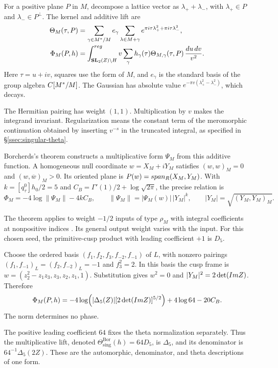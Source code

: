 For a positive plane \(P\) in \(M\), decompose a lattice vector
as \(\lambda_++\lambda_-\), with \(\lambda_+\in P\) and
\(\lambda_-\in P^\perp\). The
kernel and additive lift are
\begin{align*}
 \Theta_M(\tau,P)&=\sum_{\gamma\in M^*/M}e_\gamma
 \sum_{\lambda\in M+\gamma}
 e^{\pi i\tau\lambda_+^2+\pi i\tau\lambda_-^2},\\
 \Phi_M(P,h)&=\int^{reg}_{\mathbf{SL}_2(Z)\backslash H}
 v\sum_\gamma h_\gamma(\tau)
 \Theta_{M,\gamma}(\tau,P)\,\frac{du\,dv}{v^2}.
\end{align*}
Here \(\tau=u+iv\), squares use the form of \(M\), and
\(e_\gamma\) is the standard basis of the group algebra \(C[M^*/M]\).
The Gaussian has absolute value
\(e^{-\pi v(\lambda_+^2-\lambda_-^2)}\), which decays.

The Hermitian pairing has weight \((1,1)\). Multiplication by
\(v\) makes the integrand invariant. Regularization means the
constant term of the meromorphic continuation obtained by inserting
\(v^{-s}\) in the truncated integral, as specified in
\S\ref{ssec:singular-theta}.

Borcherds's theorem constructs a multiplicative form \(\Psi_M\)
from this additive function. A homogeneous null coordinate
\(w=X_M+iY_M\) satisfies \((w,w)_M=0\) and
\((w,\overline w)_M>0\). Its oriented plane is
\(P(w)=span_{R}(X_M,Y_M)\).
With \(k=[q_\tau^0]h_0/2=5\) and
\(C_B=\Gamma'(1)/2+\log\sqrt{2\pi}\), the precise relation is
\[
 \Phi_M=-4\log\|\Psi_M\|-4kC_B,\qquad
 \|\Psi_M\|=|\Psi_M(w)|\,|Y_M|^k,\qquad
 |Y_M|=\sqrt{(Y_M,Y_M)_M}.
\]

The theorem applies to weight \(-1/2\) inputs of type \(\rho_M\)
with integral coefficients at nonpositive indices
\cite[Theorem 13.3]{B}. Its general output weight varies with the
input. For this chosen seed, the primitive-cusp product with leading
coefficient \(+1\) is \(D_5\).

Choose the ordered basis \((f_1,f_2,f_3,f_{-2},f_{-1})\) of
\(L\), with nonzero pairings
\((f_1,f_{-1})_L=(f_2,f_{-2})_L=-1\) and \(f_3^2=2\).
In this basis the cusp frame is
\(w=(z_2^2-z_1z_3,z_3,z_2,z_1,1)\). Substitution gives \(w^2=0\)
and \(|Y_M|^2=2\det(Im Z)\). Therefore
\[
 \Phi_M(P,h)=-4\log\!\left(
 |\Delta_5(Z)|[2\det(Im Z)]^{5/2}\right)
 +4\log64-20C_B.
\]
The norm determines no phase.

The positive leading coefficient
\(64\) fixes the theta normalization separately. Thus the
multiplicative lift, denoted
\(\Theta_{\mathrm{sing}}^{\mathrm{Bor}}(h)=64D_5\), is
\(\Delta_5\), and its denominator is
\(64^{-1}\Delta_5(2Z)\). These are the automorphic,
denominator, and theta descriptions of one form.

